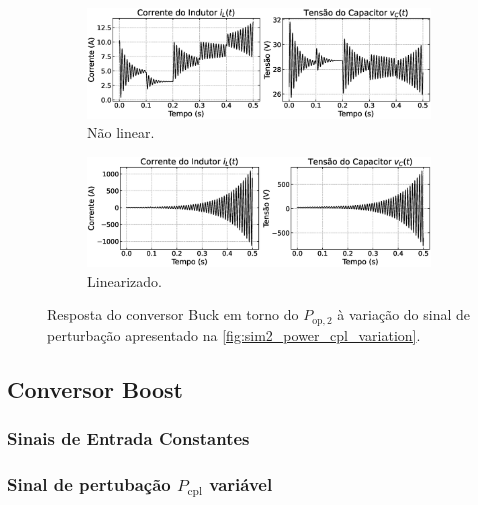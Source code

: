 \begin{figure}[H]
  \centering
  \captionsetup{justification=centering}
  \begin{subfigure}{1.\textwidth}
    \centering
    \includegraphics[width=\linewidth]{figuras/buck/sim2_op2_nonlinear.eps}
    \caption{Não linear.}
    \label{fig:sim2_op2_nonlinear}
  \end{subfigure}
  \newline
  \begin{subfigure}{1.\textwidth}
    \centering
    \includegraphics[width=\linewidth]{figuras/buck/sim2_op2_linear.eps}
    \caption{Linearizado.}
    \label{fig:simulation2_op2_linear}
  \end{subfigure}
  \caption{Resposta do conversor Buck em torno do $P_{\mathrm{op}, 2}$ à variação do sinal de perturbação apresentado na \autoref{fig:sim2_power_cpl_variation}.}
  \label{fig:simulation2_op2}
\end{figure}




\subsection{Conversor Boost}

\subsubsection{Sinais de Entrada Constantes}

\subsubsection{Sinal de pertubação $P_{\textrm{cpl}}$ variável}